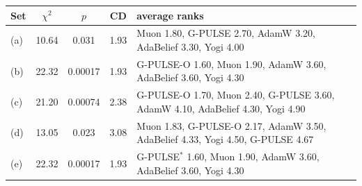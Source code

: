 \begin{tabular}{lcccl}
\toprule
Set & $\chi^2$ & $p$ & CD & average ranks\\
\midrule
(a) & 10.64 & 0.031 & 1.93 & Muon 1.80, G-PULSE 2.70, AdamW 3.20, AdaBelief 3.30, Yogi 4.00\\
(b) & 22.32 & 0.00017 & 1.93 & G-PULSE-O 1.60, Muon 1.90, AdamW 3.60, AdaBelief 3.60, Yogi 4.30\\
(c) & 21.20 & 0.00074 & 2.38 & G-PULSE-O 1.70, Muon 2.40, G-PULSE 3.60, AdamW 4.10, AdaBelief 4.30, Yogi 4.90\\
(d) & 13.05 & 0.023 & 3.08 & Muon 1.83, G-PULSE-O 2.17, AdamW 3.50, AdaBelief 4.33, Yogi 4.50, G-PULSE 4.67\\
(e) & 22.32 & 0.00017 & 1.93 & G-PULSE$^\ast$ 1.60, Muon 1.90, AdamW 3.60, AdaBelief 3.60, Yogi 4.30\\
\bottomrule
\end{tabular}